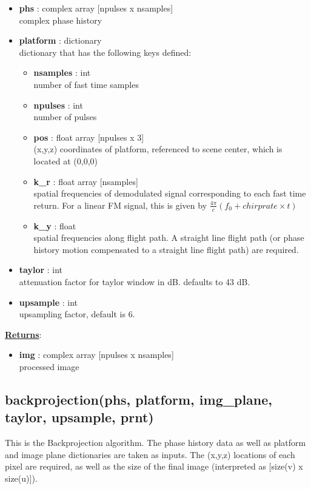 \documentclass{article}
\newcommand{\defs}[2]{\textbf{{#1}} : {#2}}
\begin{document}
\begin{itemize}
	\item \defs{phs}{complex array [npulses x nsamples]}\\
  	complex phase history
  	\item \defs{platform}{dictionary}\\
  	dictionary that has the following keys defined:
	\begin{itemize}
    	\item \defs{nsamples}{int}\\
    		number of fast time samples
	    \item \defs{npulses}{int}\\
	    	number of pulses
	    \item \defs{pos}{float array [npulses x 3]}\\
	       	(x,y,z) coordinates of platform, referenced to scene center, which is located at (0,0,0)
	    \item\defs{k\_r}{float array [nsamples]}\\
	    	spatial frequencies of demodulated signal corresponding to each fast time return.  For a linear FM signal, this is given by $\frac{4\pi}{c}(f_0+chirprate\times t)$
	    \item\defs{k\_y}{float}\\
	    	spatial frequencies along flight path.  A straight line flight path (or phase history motion compensated to a straight line flight path) are required.
	\end{itemize}
	\item\defs{taylor}{int}\\
	attenuation factor for taylor window in dB.  defaults to 43 dB.
	\item\defs{upsample}{int}\\
	upsampling factor, default is 6.
\end{itemize}

\noindent \underline{\textbf{Returns}}:
\begin{itemize}
	\item \defs{img}{complex array [npulses x nsamples]}\\
	processed image
\end{itemize} 

\newpage

\subsection{backprojection(phs, platform, img\_plane, taylor, \mbox{upsample}, prnt)}
This is the Backprojection algorithm.  The phase history data as well as platform and image plane dictionaries are taken as inputs.  The (x,y,z) locations of each pixel are required, as well as the size of the final image (interpreted as [size(v) x size(u)]).\\
\end{document}
